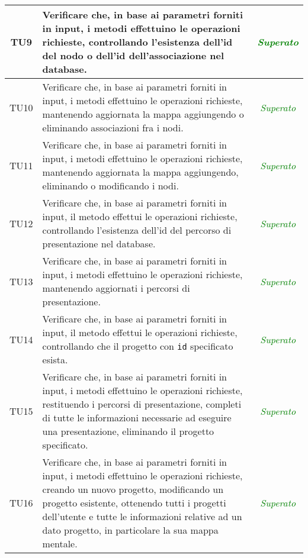 \begin{longtable}{|c|>{}m{8cm}|c|}
\hypertarget{TU9}{TU9} & Verificare che, in base ai parametri forniti in input, i metodi effettuino le operazioni richieste, controllando l'esistenza dell'id del nodo o dell'id dell'associazione nel database\finaleTestUnita{}. & \textcolor{Green}{\textit{Superato}}\\ \hline
\hypertarget{TU10}{TU10} & Verificare che, in base ai parametri forniti in input, i metodi effettuino le operazioni richieste, mantenendo aggiornata la mappa aggiungendo o eliminando associazioni fra i nodi\finaleTestUnita{}. & \textcolor{Green}{\textit{Superato}}\\ \hline
\hypertarget{TU11}{TU11} & Verificare che, in base ai parametri forniti in input, i metodi effettuino le operazioni richieste, mantenendo aggiornata la mappa aggiungendo, eliminando o modificando i nodi\finaleTestUnita{}. & \textcolor{Green}{\textit{Superato}}\\ \hline
\hypertarget{TU12}{TU12} & Verificare che, in base ai parametri forniti in input, il metodo effettui le operazioni richieste, controllando l'esistenza dell'id del percorso di presentazione nel database\finaleTestUnita{}. & \textcolor{Green}{\textit{Superato}}\\ \hline
\hypertarget{TU13}{TU13} & Verificare che, in base ai parametri forniti in input, i metodi effettuino le operazioni richieste, mantenendo aggiornati i percorsi di presentazione\finaleTestUnita{}. & \textcolor{Green}{\textit{Superato}}\\ \hline
\hypertarget{TU14}{TU14} & Verificare che, in base ai parametri forniti in input, il metodo effettui le operazioni richieste, controllando che il progetto con \texttt{id} specificato esista\finaleTestUnita{}. & \textcolor{Green}{\textit{Superato}}\\ \hline
\hypertarget{TU15}{TU15} & Verificare che, in base ai parametri forniti in input, i metodi effettuino le operazioni richieste, restituendo i percorsi di presentazione, completi di tutte le informazioni necessarie ad eseguire una presentazione, eliminando il progetto specificato\finaleTestUnita{}. & \textcolor{Green}{\textit{Superato}}\\ \hline
\hypertarget{TU16}{TU16} & Verificare che, in base ai parametri forniti in input, i metodi effettuino le operazioni richieste, creando un nuovo progetto, modificando un progetto esistente, ottenendo tutti i progetti dell'utente e tutte le informazioni relative ad un dato progetto, in particolare la sua mappa mentale\finaleTestUnita{}. & \textcolor{Green}{\textit{Superato}}\\ \hline

\end{longtable}
